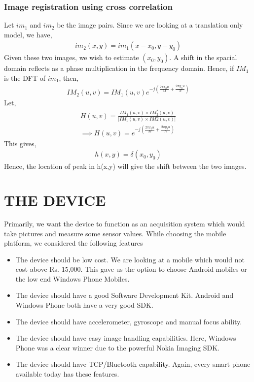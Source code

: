 \documentclass[BTech]{iitmdiss}
\begin{document}
\subsection{Image registration using cross correlation}
Let $im_1$ and $im_2$ be the image pairs. Since we are looking at a 
translation only model, we have,
\begin{align*}
im_2(x,y)=im_1(x-x_0, y-y_0)
\end{align*}
Given these two images, we wish to estimate $(x_0,y_0)$. A shift in the
spacial domain reflects as a phase multiplication in the frequency domain.
Hence, if $IM_1$ is the DFT of $im_1$, then,
\begin{align*}
IM_2(u,v) = IM_1(u,v)e^{-j(\frac{2{\pi}x_0u}{M}+\frac{2{\pi}y_0u}{N})}
\end{align*}
Let,
\begin{align*}
H(u,v) = \frac{IM_1(u,v){\times}IM_2^*(u,v)}{|IM_1(u,v){\times}IM2(u,v)|}\\
\implies H(u,v) = e^{-j(\frac{2{\pi}x_0u}{M}+\frac{2{\pi}y_0u}{N})}
\end{align*}
This gives,
\begin{align*}
h(x,y) = \delta(x_0, y_0)
\end{align*}
Hence, the location of peak in h(x,y) will give the shift between the 
two images. 

\pagebreak
\chapter{THE DEVICE}
\label{chap:device}
Primarily, we want the device to function as an acquisition system which
would take pictures and measure some sensor values. While choosing the
mobile platform, we considered the following features
\begin{itemize}
\item The device should be low cost. We are looking at a mobile which
would not cost above Rs. 15,000. This gave us the option to choose 
Android mobiles or the low end Windows Phone Mobiles.
\item The device should have a good Software Development Kit. Android
and Windows Phone both have a very good SDK.
\item The device should have accelerometer, gyroscope and manual focus
ability. 
\item The device should have easy image handling capabilities. Here, 
Windows Phone was a clear winner due to the powerful Nokia Imaging SDK.
\item The device should have TCP/Bluetooth capability. Again, every 
smart phone available today has these features. 
\end{itemize}
 
\end{document}
